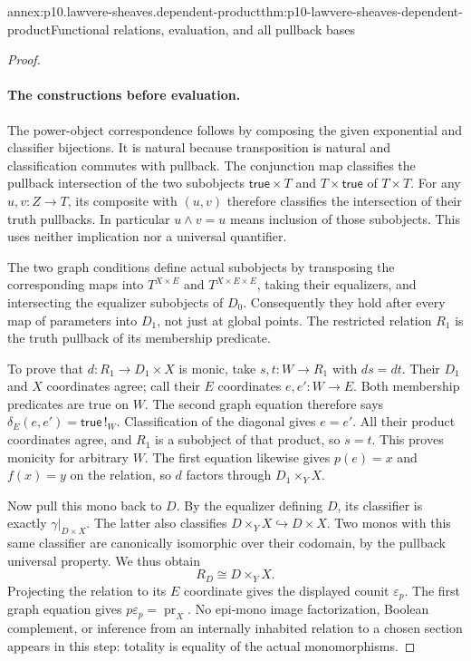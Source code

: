 \begin{annexitem}{annex:p10.lawvere-sheaves.dependent-product}{thm:p10-lawvere-sheaves-dependent-product}{Functional relations, evaluation, and all pullback bases}
\begin{proof}
\paragraph{The constructions before evaluation.}
The power-object correspondence follows by composing the given
exponential and classifier bijections.  It is natural because
transposition is natural and classification commutes with pullback.
The conjunction map classifies the pullback intersection of the
two subobjects \(\mathsf{true}\times T\) and
\(T\times\mathsf{true}\) of \(T\times T\).  For any
\(u,v:Z\to T\), its composite with \((u,v)\) therefore
classifies the intersection of their truth pullbacks.  In particular
\(u\land v=u\) means inclusion of those subobjects.  This
uses neither implication nor a universal quantifier.

The two graph conditions define actual subobjects by transposing
the corresponding maps into \(T^{X\times E}\) and
\(T^{X\times E\times E}\), taking their equalizers, and
intersecting the equalizer subobjects of \(D_0\).
Consequently they hold after every map of parameters into \(D_1\),
not just at global points.  The restricted relation \(R_1\)
is the truth pullback of its membership predicate.

To prove that \(d:R_1\to D_1\times X\) is monic, take
\(s,t:W\to R_1\) with \(ds=dt\).  Their \(D_1\) and
\(X\) coordinates agree; call their \(E\) coordinates
\(e,e':W\to E\).  Both membership predicates are true on
\(W\).  The second graph equation therefore says
\(\delta_E(e,e')=\mathsf{true}\,!_W\).  Classification of
the diagonal gives \(e=e'\).  All their product coordinates
agree, and \(R_1\) is a subobject of that product, so \(s=t\).
This proves monicity for arbitrary \(W\).  The first equation
likewise gives \(p(e)=x\) and \(f(x)=y\) on the relation,
so \(d\) factors through \(D_1\times_Y X\).

Now pull this mono back to \(D\).  By the equalizer defining
\(D\), its classifier is exactly \(\gamma|_{D\times X}\).
The latter also classifies \(D\times_Y X\hookrightarrow
D\times X\).  Two monos with this same classifier are
canonically isomorphic over their codomain, by the pullback
universal property.  We thus obtain
\[
                       R_D\cong D\times_Y X.
\]
Projecting the relation to its \(E\) coordinate gives the
displayed counit \(\varepsilon_p\).  The first graph equation
gives \(p\varepsilon_p=\operatorname{pr}_X\).
No epi-mono image factorization, Boolean complement, or inference
from an internally inhabited relation to a chosen section appears
in this step: totality is equality of the actual monomorphisms.


\end{proof}
\end{annexitem}
